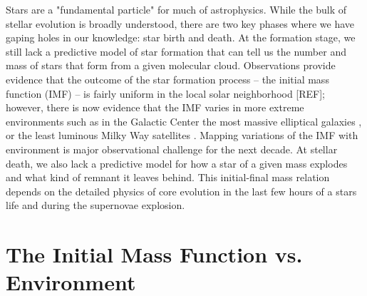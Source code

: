 \documentclass[11pt]{article}
\begin{document}
%


%

\sciencejustification

Stars are a "fundamental particle" for much of astrophysics. While the bulk of stellar evolution is broadly understood, there are two key phases where we have gaping holes in our knowledge: star birth and death. 
At the formation stage, we still lack a predictive model of star formation that can tell us the number and mass of stars that form from a given molecular cloud. 
Observations provide evidence that the outcome of the star formation process -- the initial mass function (IMF) -- is fairly uniform in the local solar neighborhood [REF]; however, there is now evidence that the IMF varies in more extreme environments such as in the Galactic Center \citep{Lu:2013,Hosek:2018} the most massive elliptical galaxies \citep{vanDokkum:2010}, or the least luminous Milky Way satellites \citep{Geha:2013}. 
Mapping variations of the IMF with environment is major observational challenge for the next decade. 
At stellar death, we also lack a predictive model for how a star of a given mass explodes and what kind of remnant it leaves behind. 
This initial-final mass relation depends on the detailed physics of core evolution in the last few hours of a stars life and during the supernovae explosion. 

\section{The Initial Mass Function vs. Environment}
\end{document}

